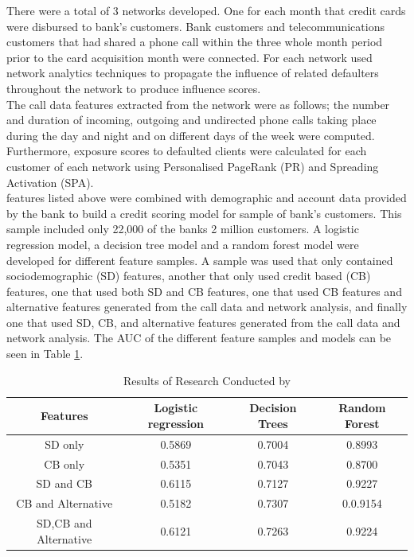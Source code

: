 \vspace{15pt}

 There were a total of 3 networks developed. One for each month that credit cards were disbursed to bank's customers. Bank customers and telecommunications customers that had shared a phone call within the three whole month period prior to the card acquisition month were connected. For each network \textcite{BigDataMicroFiance} used network analytics techniques to  propagate the influence of related defaulters throughout the network to produce influence scores. \\
 
 The call data features extracted from the network were as follows; the number and duration of incoming, outgoing and undirected phone calls taking place during the day and night and on different days of the week were computed. Furthermore, exposure scores to defaulted clients were calculated for each customer of each network using Personalised PageRank (PR) and Spreading Activation (SPA). \\
 
 
\textcite{BigDataMicroFiance} features listed above were combined with demographic and account data provided by the bank to build a credit scoring model for sample of bank's customers. This sample included only 22,000 of the banks 2 million customers. A logistic regression model, a decision tree model and a random forest model were developed for different feature samples. A sample was used that only contained sociodemographic (SD) features, another that only used credit based (CB) features, one that used both SD and CB features, one that used CB features and alternative features generated from the call data and network analysis, and finally one that used SD, CB, and alternative features generated from the call data and network analysis. The AUC of the different feature samples and models can be seen in Table \ref{table:alt}. 

\vspace{15pt}

\begin{table}[H]
\begin{center}
\begin{tabular}{|c|c|c|c|} 
\hline
\multicolumn{1}{|c}{Features}  &\multicolumn{1}{|c|}{Logistic regression}  &\multicolumn{1}{|c|}{Decision Trees} & \multicolumn{1}{c|}{Random Forest}\\
\hline
SD only  & 0.5869 &  0.7004 & 0.8993  \\
\hline
CB only & 0.5351 & 0.7043 & 0.8700  \\
\hline
SD and CB & 0.6115 & 0.7127 & 0.9227  \\
\hline
CB and Alternative & 0.5182 & 0.7307 & 0.0.9154  \\
\hline
SD,CB and Alternative & 0.6121 & 0.7263 & 0.9224  \\
\hline
\end{tabular}
\end{center}
\caption{Results of Research Conducted by \textcite{BigDataMicroFiance}}
\label{table:alt}
\end{table}

